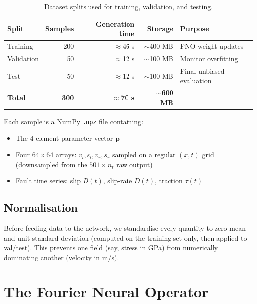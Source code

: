\documentclass[12pt, a4paper]{article}
\theoremstyle{definition}
\begin{document}
\begin{table}[H]
  \centering
  \caption{Dataset splits used for training, validation, and testing.}
  \label{tab:dataset}
  \begin{tabular}{lrrrl}
    \toprule
    \textbf{Split} & \textbf{Samples} & \textbf{Generation time} & \textbf{Storage} & \textbf{Purpose} \\
    \midrule
    Training & 200 & $\approx$46 s & $\sim$400 MB & FNO weight updates \\
    Validation & 50 & $\approx$12 s & $\sim$100 MB & Monitor overfitting \\
    Test & 50 & $\approx$12 s & $\sim$100 MB & Final unbiased evaluation \\
    \midrule
    \textbf{Total} & \textbf{300} & $\approx$\textbf{70 s} & $\sim$\textbf{600 MB} & \\
    \bottomrule
  \end{tabular}
\end{table}

Each sample is a NumPy \texttt{.npz} file containing:
\begin{itemize}
  \item The 4-element parameter vector $\bm{p}$
  \item Four $64\times64$ arrays: $v_l, s_l, v_r, s_r$ sampled on a regular
    $(x,t)$ grid (downsampled from the $501 \times n_t$ raw output)
  \item Fault time series: slip $D(t)$, slip-rate $\dot{D}(t)$, traction $\tau(t)$
\end{itemize}

\subsection{Normalisation}

Before feeding data to the network, we standardise every quantity to
zero mean and unit standard deviation (computed on the training set only,
then applied to val/test).  This prevents one field (say, stress in GPa) from
numerically dominating another (velocity in m/s).

\section{The Fourier Neural Operator}
\label{sec:fno}
\end{document}
